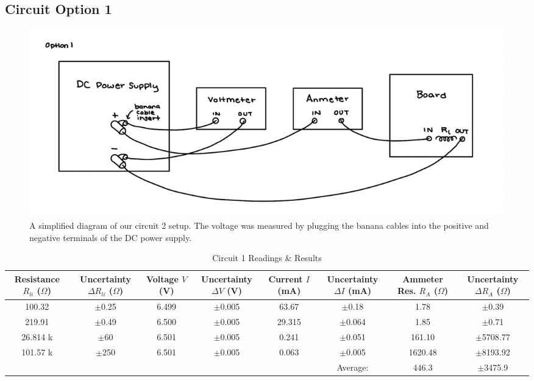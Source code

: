 \documentclass{article} %
\begin{document}
\subsection{Circuit Option 1}
\begin{figure}[htbp]            %
  \centering
  \includegraphics[width=0.9\linewidth]{Figs/Cct_1_Diagram.png}
  \caption{A simplified diagram of our circuit 2 setup.
            The voltage was measured by plugging the banana cables into the positive and negative terminals of the DC power supply.}
  \label{fig:Cct_1_Diagram}
\end{figure}

\begin{table}[htbp]
\centering
\caption{Circuit 1 Readings \& Results}
\begin{tabular}{|c|c|c|c|c|c|c|c|}
\hline
\makecell{Resistance \\ $R_{li}$ ($\Omega$)} & \makecell{Uncertainty \\ $\Delta R_{li}$ ($\Omega$)} & \makecell{Voltage \\ $V$ (V)} & \makecell{Uncertainty \\ $\Delta V$ (V)} & \makecell{Current \\ $I$ (mA)} & \makecell{Uncertainty \\ $\Delta I$ (mA)} & \makecell{Ammeter Res. \\ $R_A$ ($\Omega$)} & \makecell{Uncertainty \\ $\Delta R_A$ ($\Omega$)} \\
\hline
100.32 & $\pm$0.25 & 6.499 & $\pm$0.005 & 63.67 & $\pm$0.18 & 1.78 & $\pm$0.39 \\
\hline
219.91 & $\pm$0.49 & 6.500 & $\pm$0.005 & 29.315 & $\pm$0.064 & 1.85 & $\pm$0.71 \\
\hline
26.814 k & $\pm$60 & 6.501 & $\pm$0.005 & 0.241 & $\pm$0.051 & 161.10 & $\pm$5708.77 \\
\hline
101.57 k & $\pm$250 & 6.501 & $\pm$0.005 & 0.063 & $\pm$0.005 & 1620.48 & $\pm$8193.92 \\
\hline
\cellcolor{gray!50} & \cellcolor{gray!50} & \cellcolor{gray!50} & \cellcolor{gray!50} & \cellcolor{gray!50} & Average: & 446.3 & $\pm$3475.9 \\
\hline
\end{tabular}
\end{table}
\end{document}
